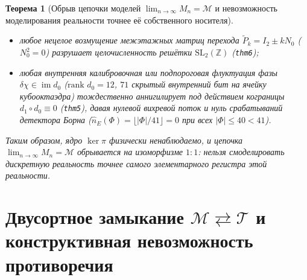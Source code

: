 \documentclass[11pt,a4paper]{article}
\newtheorem{theorem}{Теорема}[section]
\theoremstyle{definition}
\theoremstyle{remark}
\begin{document}
\begin{theorem}[Обрыв цепочки моделей $\lim_{n\to\infty} M_n = \mathcal{M}$ и невозможность моделирования реальности точнее её собственного носителя]
\begin{enumerate}[label=\textbf{(\roman*)},leftmargin=*]
  \begin{itemize}[noitemsep]
  \item любое нецелое возмущение межэтажных матриц перехода $\widetilde{P}_k = I_2 \pm k N_0$ ($N_0^2 = 0$) разрушает целочисленность решётки $\mathrm{SL}_2(\mathbb{Z})$ (\texttt{thm6});
  \item любая внутренняя калибровочная или подпороговая флуктуация фазы $\delta\chi \in \operatorname{im} d_0$ ($\text{rank } d_0 = 12$, $71$ скрытый внутренний бит на ячейку кубооктаэдра) тождественно аннигилирует под действием кограницы $d_1\circ d_0 \equiv 0$ (\texttt{thm5}), давая нулевой вихревой поток и нуль срабатываний детектора Борна ($\hat{n}_E(\Phi) = \lfloor|\Phi|/41\rfloor = 0$ при всех $|\Phi|\le 40 < 41$).
  \end{itemize}
  Таким образом, ядро $\ker\pi$ физически ненаблюдаемо, и цепочка $\lim_{n\to\infty} M_n = \mathcal{M}$ обрывается на изоморфизме $1:1$: \emph{нельзя смоделировать дискретную реальность точнее самого элементарного регистра этой реальности}.
\end{enumerate}
\end{theorem}

\section{Двусортное замыкание $\mathcal{M} \rightleftarrows \mathcal{T}$ и конструктивная невозможность противоречия}
\label{sec:bilateral-closure}
\end{document}
